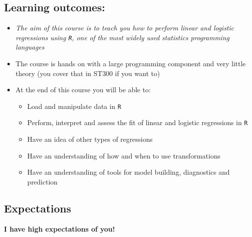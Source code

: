 \documentclass[
]{gitbook}
\providecommand{\tightlist}{%
  \setlength{\itemsep}{0pt}\setlength{\parskip}{0pt}}
\begin{document}
\hypertarget{learning-outcomes}{%
\subsection{Learning outcomes:}\label{learning-outcomes}}

\begin{itemize}
\tightlist
\item
  \emph{The aim of this course is to teach you how to perform linear and logistic regressions using \texttt{R}, one of the most widely used statistics programming languages}
\item
  The course is hands on with a large programming component and very little theory (you cover that in ST300 if you want to)
\item
  At the end of this course you will be able to:

  \begin{itemize}
  \tightlist
  \item
    Load and manipulate data in \texttt{R}
  \item
    Perform, interpret and assess the fit of linear and logistic regressions in \texttt{R}
  \item
    Have an idea of other types of regressions
  \item
    Have an understanding of how and when to use transformations
  \item
    Have an understanding of tools for model building, diagnostics and prediction
  \end{itemize}
\end{itemize}

\hypertarget{expectations}{%
\subsection{Expectations}\label{expectations}}

\textbf{I have high expectations of you!}
\end{document}
